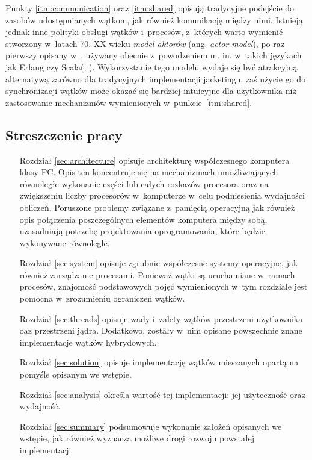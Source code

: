 \documentclass[11pt,makeidx]{mwart}
\begin{document}
\par
%
\indent
	Punkty \ref{itm:communication} oraz \ref{itm:shared} opisują tradycyjne podejście do zasobów udostępnianych wątkom, jak również
	komunikację między nimi. Istnieją jednak inne polityki obsługi wątków i~procesów, z~których warto wymienić stworzony w~latach 70. XX wieku 
	\emph{model aktorów} (ang. \emph{actor model}), po raz pierwszy opisany w~\cite{Hewitt1973ActorFormalism}, używany obecnie z~powodzeniem m. in. w~takich językach jak Erlang czy Scala(\cite{scala1}, \cite{scala2}).
	Wykorzystanie tego modelu wydaje się być atrakcyjną alternatywą zarówno dla tradycyjnych implementacji jacketingu, zaś
	użycie go do synchronizacji wątków może okazać się bardziej intuicyjne dla użytkownika niż zastosowanie mechanizmów wymienionych
	w~punkcie~\ref{itm:shared}.
\par
%
\subsection{Streszczenie pracy}
\indent
	\begin{itemize}
	\item[Rozdział \ref{sec:architecture}] opisuje architekturę współczesnego komputera klasy PC. Opis ten koncentruje się na 
		mechanizmach umożliwiających równoległe wykonanie części lub całych rozkazów procesora oraz na zwiększeniu liczby procesorów
		w~komputerze w~celu podniesienia wydajności obliczeń. Poruszone problemy związane z~pamięcią operacyjną jak również opis połączenia
		poszczególnych elementów komputera między sobą, uzasadniają potrzebę projektowania oprogramowania, które będzie wykonywane równolegle.
	\item[Rozdział \ref{sec:system}] opisuje zgrubnie współczesne systemy operacyjne, jak również zarządzanie procesami. Ponieważ wątki są 
		uruchamiane w~ramach procesów, znajomość podstawowych pojęć wymienionych w~tym rozdziale jest pomocna w~zrozumieniu ograniczeń wątków.
	\item[Rozdział \ref{sec:threads}] opisuje wady i~zalety wątków przestrzeni użytkownika oaz przestrzeni jądra. Dodatkowo, zostały w~nim
		opisane powszechnie znane implementacje wątków hybrydowych.
	\item[Rozdział \ref{sec:solution}] opisuje implementację wątków mieszanych opartą na pomyśle opisanym we wstępie.
	\item[Rozdział \ref{sec:analysis}] określa wartość tej implementacji: jej użyteczność oraz wydajność.
	\item[Rozdział \ref{sec:summary}] podsumowuje wykonanie założeń opisanych we wstępie, jak również wyznacza możliwe drogi rozwoju
		powstałej implementacji
	\end{itemize}
\par
%
\newpage
\end{document}
